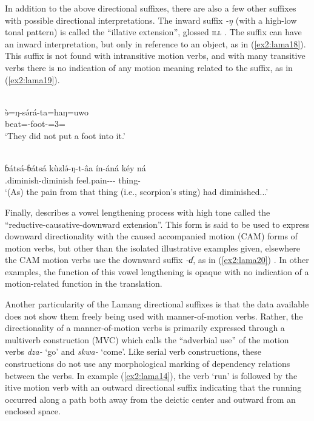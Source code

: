 In addition to the above directional suffixes, there are also a few other suffixes with possible directional interpretations. The inward suffix \textit{-ŋ} (with a high-low tonal pattern) is called the ``illative extension'', glossed \textsc{ill} \citep[153]{wolffLamangLanguageDictionary2015}. The suffix can have an inward interpretation, but only in reference to an object, as in (\ref{ex2:lama18}). This suffix is not found with intransitive motion verbs, and with many transitive verbs there is no indication of any motion meaning related to the suffix, as in (\ref{ex2:lama19}). %

\ea\label{ex2:lama18}
 \\
\gll 
ɘ̀=ŋ-sə́rá-ta=haŋ=uwo	\\
beat=-foot-=3= \\
\glt `They did not put a foot into it.'
\z 

\ea\label{ex2:lama19}
 \\
\gll 
ɓátsá-ɓátsá kùzlə́-ŋ-t-âa ín-áná kéy ná	\\
.diminish-diminish feel.pain--- thing-  		\\
\glt `(As) the pain from that thing (i.e., scorpion’s sting) had diminished...'
\z 

Finally, \citet[159]{wolffLamangLanguageDictionary2015} describes a vowel lengthening process with high tone called the ``reductive-causative-downward extension''. This form is said to be used to express downward directionality with the caused accompanied motion (CAM) forms of motion verbs, but other than the isolated illustrative examples given, elsewhere the CAM motion verbs use the downward suffix \textit{-ɗ}, as in (\ref{ex2:lama20}) \citep[see also][271]{wolffLamangLanguageDictionary2015}. In other examples, the function of this vowel lengthening is opaque with no indication of a motion-related function in the translation. 

Another particularity of the Lamang directional suffixes is that the data available does not show them freely being used with manner-of-motion verbs. Rather, the directionality of a manner-of-motion verbs is primarily expressed through a multiverb construction (MVC) which \citet[146]{wolffLamangLanguageDictionary2015} calls the ``adverbial use'' of the motion verbs \textit{dza-} ‘go’ and \textit{skwa-} ‘come’. Like serial verb constructions, these constructions do not use any morphological marking of dependency relations between the verbs. In example (\ref{ex2:lama14}), the verb `run' is followed by the itive motion verb with an outward directional suffix indicating that the running occurred along a path both away from the deictic center and outward from an enclosed space.

